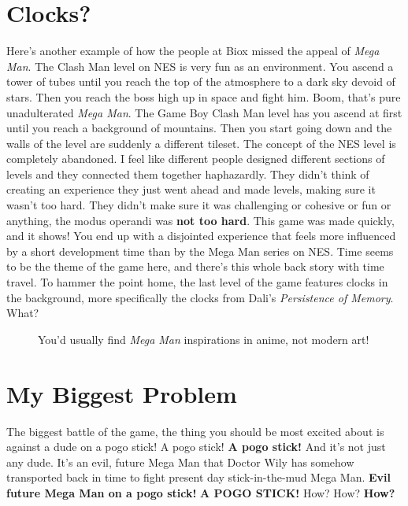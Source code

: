 \documentclass{book}
\begin{document}
\FloatBarrier\section*{Clocks?}
Here’s another example of how the people at Biox missed the appeal of \emph{Mega Man}. The Clash Man level on NES is very fun as an environment. You ascend a tower of tubes until you reach the top of the atmosphere to a dark sky devoid of stars. Then you reach the boss high up in space and fight him. Boom, that’s pure unadulterated \emph{Mega Man}. The Game Boy Clash Man level has you ascend at first until you reach a background of mountains. Then you start going down and the walls of the level are suddenly a different tileset. The concept of the NES level is completely abandoned. I feel like different people designed different sections of levels and they connected them together haphazardly. They didn’t think of creating an experience they just went ahead and made levels, making sure it wasn’t too hard. They didn’t make sure it was challenging or cohesive or fun or anything, the modus operandi was \textbf{not too hard}. This game was made quickly, and it shows! You end up with a disjointed experience that feels more influenced by a short development time than by the Mega Man series on NES. Time seems to be the theme of the game here, and there’s this whole back story with time travel. To hammer the point home, the last level of the game features clocks in the background, more specifically the clocks from Dali’s \emph{Persistence of Memory}. What?\par
\FloatBarrier\vspace{\baselineskip}\begin{figure}[H]\caption*{You’d usually find \emph{Mega Man} inspirations in anime, not modern art!}\end{figure}
\FloatBarrier\section*{My Biggest Problem}
The biggest battle of the game, the thing you should be most excited about is against a dude on a pogo stick! A pogo stick! \textbf{A pogo stick!} And it’s not just any dude. It’s an evil, future Mega Man that Doctor Wily has somehow transported back in time to fight present day stick-in-the-mud Mega Man. \textbf{Evil future Mega Man on a pogo stick!} \textbf{A POGO STICK!} How? How? \textbf{How?}\par
\end{document}
